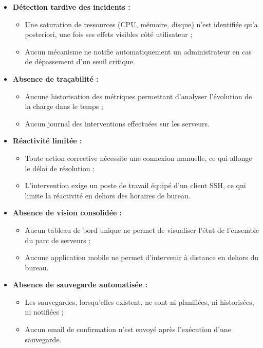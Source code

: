 \begin{itemize}[label=]
\item \textbf{Détection tardive des incidents :}
\begin{itemize}[label=]
    \item Une saturation de ressources (CPU, mémoire, disque) n'est identifiée qu'a
          posteriori, une fois ses effets visibles côté utilisateur ;
    \item Aucun mécanisme ne notifie automatiquement un administrateur en cas de
          dépassement d'un seuil critique.
\end{itemize}

\item \textbf{Absence de traçabilité :}
\begin{itemize}[label=]
    \item Aucune historisation des métriques permettant d'analyser l'évolution de la
          charge dans le temps ;
    \item Aucun journal des interventions effectuées sur les serveurs.
\end{itemize}

\item \textbf{Réactivité limitée :}
\begin{itemize}[label=]
    \item Toute action corrective nécessite une connexion manuelle, ce qui allonge le
          délai de résolution ;
    \item L'intervention exige un poste de travail équipé d'un client SSH, ce qui limite
          la réactivité en dehors des horaires de bureau.
\end{itemize}

\item \textbf{Absence de vision consolidée :}
\begin{itemize}[label=]
    \item Aucun tableau de bord unique ne permet de visualiser l'état de l'ensemble du
          parc de serveurs ;
    \item Aucune application mobile ne permet d'intervenir à distance en dehors du
          bureau.
\end{itemize}

\item \textbf{Absence de sauvegarde automatisée :}
\begin{itemize}[label=]
    \item Les sauvegardes, lorsqu'elles existent, ne sont ni planifiées, ni historisées,
          ni notifiées ;
    \item Aucun email de confirmation n'est envoyé après l'exécution d'une sauvegarde.
\end{itemize}
\end{itemize}

